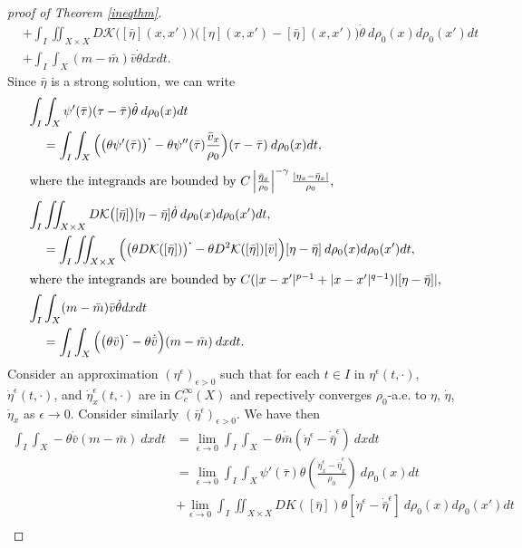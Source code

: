 \documentclass[10pt, letterpaper]{article}
\def\K{{\mathcal{K}}}
\def\drr{{d\rho_0(x)d\rho_0(x')}}
\def\dr{{d\rho_0(x)}}
\def\bdot{{\boldsymbol{\cdot}}}
\theoremstyle{definition}
\theoremstyle{remark}
\begin{document}
\begin{proof}[proof of Theorem \ref{ineqthm}]
\begin{equation}
\begin{aligned}
        & + \int_I\iint_{X \times X} D\mathcal{K}\big([\bar{\eta}](x, x')\big)\big([\eta](x, x') - [\bar{\eta}](x, x')\big)\dot\theta \: \drr dt\\
        &  + \int_I\int_X ({m}-\bar{{m}})\bar{v}\dot\theta dxdt.
\end{aligned}
\end{equation}
Since $\bar\eta$ is a strong solution, we can write
\begin{align*}
        \int_I & \int_{X} \psi'(\bar\tau)(\tau - \bar\tau) \dot\theta \:\dr dt\\
        & = \int_I\int_X \Big( \big(\theta\psi'(\bar\tau)\big)^\bdot -  \theta\psi''(\bar\tau)\frac{\bar{v}_x}{\rho_0}\Big)(\tau - \bar\tau) \:\dr dt, \\
        \intertext{where the integrands are bounded by $C\left|\frac{\bar{\eta}_x}{\rho_0}\right|^{-\gamma}\frac{|\eta_x - \bar\eta_x|}{\rho_0}$,}
        \int_I & \iint_{X\times X} D\mathcal{K}\big([\bar{\eta}]\big)[\eta-\bar{\eta}]\dot\theta \: \drr dt,\\
        & = \int_I \iint_{X\times X} \Big(\big(\theta D\K([\bar\eta]) \big)^{\boldsymbol{\cdot}} - \theta D^2\K([\bar\eta])[\bar v]\Big)[\eta - \bar\eta] \:\drr dt,\\
        \intertext{where the integrands are bounded by $C(|x-x'|^{p-1} + |x-x'|^{q-1})|[\eta - \bar\eta]|$,} 
        \int_I&\int_X ({m}-\bar{{m}})\bar{v}\dot\theta dxdt\\
        & = \int_I\int_X \Big(\big(\theta \bar{v}\big)^\bdot - \theta \dot{\bar{v}}\Big)({m}-\bar{{m}}) \: dxdt.
\end{align*}
Consider an approximation $(\eta^\epsilon)_{\epsilon>0}$ such that for each $t\in I$ in $\eta^\epsilon(t,\cdot)$, $\dot{\eta}^\epsilon(t,\cdot)$, and $\dot{\eta}_x^\epsilon(t,\cdot)$ are in $C_c^\infty(X)$ and repectively converges $\rho_0$-a.e. to $\eta$, $\dot{\eta}$, $\dot{\eta}_x$ as $\epsilon \rightarrow 0$. Consider similarly $(\bar\eta^\epsilon)_{\epsilon>0}$.
We have then
\begin{equation}\label{secondeqn}
\begin{aligned}
 \int_I\int_X -\theta \dot{\bar{v}}(m-\bar m) \:dx dt &= \lim_{\epsilon \rightarrow 0}  \int_I\int_X -\theta \dot{\bar{m}}(\dot\eta^\epsilon -\dot{\bar\eta}^\epsilon) \:dx dt\\
 &= \lim_{\epsilon \rightarrow 0}\int_I\int_X \psi'(\bar\tau)\theta\left(\frac{\dot{\eta}^\epsilon_x - \dot{\bar\eta}^\epsilon_x}{\rho_0}\right) \: \dr dt \\
 &+ \lim_{\epsilon \rightarrow 0}\int_I\iint_{X\times X} DK([\bar\eta])\theta  [\dot{\eta}^\epsilon-\dot{\bar\eta}^\epsilon] \:\drr dt\\

\end{aligned}
\end{equation}
\end{proof}
\end{document}
